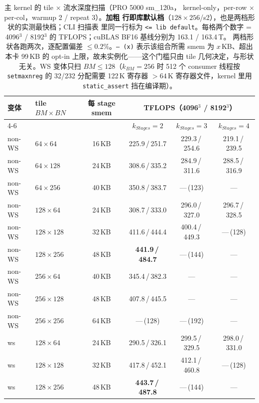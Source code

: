 \begin{table}[H]
\centering
\scriptsize
\begin{tabular}{llcccc}
\toprule
变体 & tile $BM\times BN$ & 每 stage smem &
  \multicolumn{3}{c}{TFLOPS（4096$^3$ / 8192$^3$）} \\
\cmidrule(l){4-6}
 & & & $k_{Stages}{=}2$ & $k_{Stages}{=}3$ & $k_{Stages}{=}4$ \\
\midrule
non-WS & $64\times64$   & 16\,KB & 225.9\,/\,251.7 & 229.3\,/\,254.6 & 219.1\,/\,239.5 \\
non-WS & $64\times128$  & 24\,KB & 308.6\,/\,335.2 & 284.9\,/\,311.6 & 288.5\,/\,316.9 \\
non-WS & $64\times256$  & 40\,KB & 350.8\,/\,383.7 & ---\,(123) & --- \\
non-WS & $128\times64$  & 24\,KB & 308.7\,/\,333.0 & 296.0\,/\,327.0 & 296.7\,/\,328.5 \\
non-WS & $128\times128$ & 32\,KB & 411.6\,/\,444.4 & 400.4\,/\,449.3 & ---\,(128) \\
non-WS & $128\times256$ & 48\,KB & \textbf{441.9\,/\,484.7} & ---\,(144) & --- \\
non-WS & $256\times64$  & 40\,KB & 345.4\,/\,382.3 & --- & --- \\
non-WS & $256\times128$ & 48\,KB & 407.8\,/\,445.5 & --- & --- \\
non-WS & $256\times256$ & 64\,KB & ---\,(128) & ---\,(192) & --- \\
\midrule
ws & $128\times64$  & 24\,KB & 290.5\,/\,326.1 & 299.5\,/\,329.5 & 298.0\,/\,331.0 \\
ws & $128\times128$ & 32\,KB & 417.8\,/\,452.1 & 412.1\,/\,460.8 & ---\,(128) \\
ws & $128\times256$ & 48\,KB & \textbf{443.7\,/\,487.8} & ---\,(144) & --- \\
\bottomrule
\end{tabular}
\caption{主 kernel 的 tile $\times$ 流水深度扫描（PRO 5000 sm\_120a，
kernel-only，per-row $\times$ per-col，warmup 2 / repeat 3）。\textbf{加粗
行即库默认档}（$128\times256$/s2），也是两档形状的实测最快档；CLI 扫描表
里同一行标为 \texttt{<= lib default}。每格两个数字
= 4096$^3$ / 8192$^3$ 的 TFLOPS；cuBLAS BF16 基线分别为 163.1 / 163.4\,T。
两档形状各跑两次，逐配置偏差 $\le0.2\%$。\texttt{---\,(x)} 表示该组合所需
smem 为 $x$\,KB、超出本卡 99\,KB 的 opt-in 上限，故未实例化——这个门槛只由
tile 几何决定，与形状无关。WS 变体只扫 $BM\le128$（$k_{BM}{=}256$ 时 512 个
consumer 线程按 \texttt{setmaxnreg} 的 32/232 分配需要 122\,K 寄存器
$>64$\,K 寄存器文件，kernel 里用 \texttt{static\_assert} 挡在编译期）。}
\label{tab:35-sweep}
\end{table}


